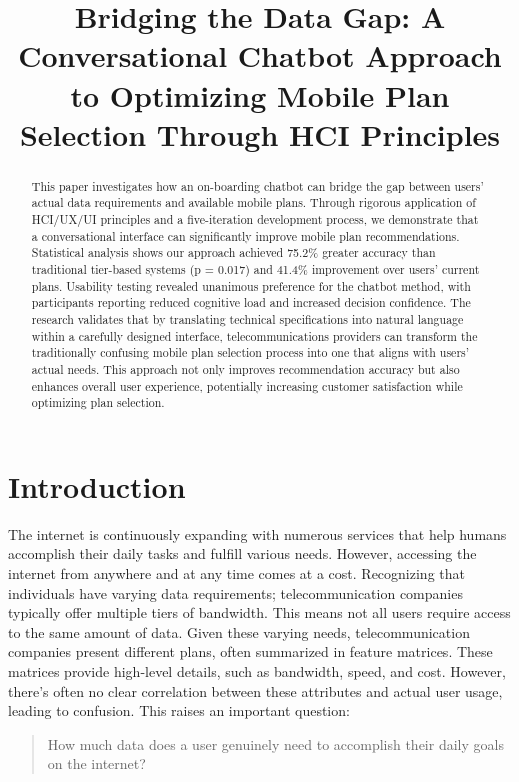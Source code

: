 \documentclass[conference]{IEEEtran}
\begin{document}
\title{Bridging the Data Gap: A Conversational Chatbot Approach to Optimizing Mobile Plan Selection Through HCI Principles}

\author{
\and
{}
}

\maketitle

\begin{abstract}
This paper investigates how an on-boarding chatbot can bridge the gap between users' actual data requirements and available mobile plans. Through rigorous application of HCI/UX/UI principles and a five-iteration development process, we demonstrate that a conversational interface can significantly improve mobile plan recommendations. Statistical analysis shows our approach achieved 75.2\% greater accuracy than traditional tier-based systems (p = 0.017) and 41.4\% improvement over users' current plans. Usability testing revealed unanimous preference for the chatbot method, with participants reporting reduced cognitive load and increased decision confidence. The research validates that by translating technical specifications into natural language within a carefully designed interface, telecommunications providers can transform the traditionally confusing mobile plan selection process into one that aligns with users' actual needs. This approach not only improves recommendation accuracy but also enhances overall user experience, potentially increasing customer satisfaction while optimizing plan selection.
\end{abstract}


\section{Introduction}
The internet is continuously expanding with numerous services that help humans accomplish their daily tasks and fulfill
various needs. However, accessing the internet from anywhere
and at any time comes at a cost. Recognizing that individuals
have varying data requirements; telecommunication companies
typically offer multiple tiers of bandwidth. This means not
all users require access to the same amount of data. Given
these varying needs, telecommunication companies present
different plans, often summarized in feature matrices. These
matrices provide high-level details, such as bandwidth, speed,
and cost. However, there’s often no clear correlation between
these attributes and actual user usage, leading to confusion.
This raises an important question:\begin{quote}
    How much data does a user genuinely need to
accomplish their daily goals on the internet?
\end{quote}
\end{document}
